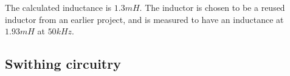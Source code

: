 The calculated inductance is $1.3 mH$. The inductor is chosen to be a reused inductor from an earlier project, and is measured to have an inductance at $1.93mH$ at $50kHz$. 

\subsection{Swithing circuitry}











